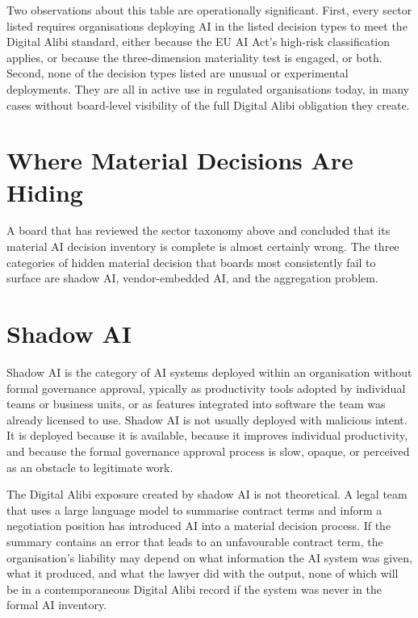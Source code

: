 Two observations about this table are operationally significant. First, every sector listed requires organisations deploying AI in the listed decision types to meet the Digital Alibi standard, either because the EU AI Act's high-risk classification applies, or because the three-dimension materiality test is engaged, or both. Second, none of the decision types listed are unusual or experimental deployments. They are all in active use in regulated organisations today, in many cases without board-level visibility of the full Digital Alibi obligation they create.

\scenebreak

\section{Where Material Decisions Are Hiding}

A board that has reviewed the sector taxonomy above and concluded that its material AI decision inventory is complete is almost certainly wrong. The three categories of hidden material decision that boards most consistently fail to surface are shadow AI, vendor-embedded AI, and the aggregation problem.

\section{Shadow AI}

Shadow AI is the category of AI systems deployed within an organisation without formal governance approval, ypically as productivity tools adopted by individual teams or business units, or as features integrated into software the team was already licensed to use. Shadow AI is not usually deployed with malicious intent. It is deployed because it is available, because it improves individual productivity, and because the formal governance approval process is slow, opaque, or perceived as an obstacle to legitimate work.

The Digital Alibi exposure created by shadow AI is not theoretical. A legal team that uses a large language model to summarise contract terms and inform a negotiation position has introduced AI into a material decision process. If the summary contains an error that leads to an unfavourable contract term, the organisation's liability may depend on what information the AI system was given, what it produced, and what the lawyer did with the output, none of which will be in a contemporaneous Digital Alibi record if the system was never in the formal AI inventory.

